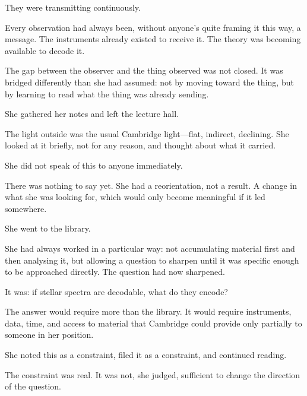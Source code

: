 They were transmitting continuously.

Every observation had always been, without anyone's quite
framing it this way, a message. The instruments already
existed to receive it. The theory was becoming available to
decode it.

The gap between the observer and the thing observed was not
closed. It was bridged differently than she had assumed: not by
moving toward the thing, but by learning to read what the thing
was already sending.

She gathered her notes and left the lecture hall.

The light outside was the usual Cambridge light---flat,
indirect, declining. She looked at it briefly, not for
any reason, and thought about what it carried.

\scenebreak

She did not speak of this to anyone immediately.

There was nothing to say yet. She had a reorientation, not a
result. A change in what she was looking for, which would only
become meaningful if it led somewhere.

She went to the library.

She had always worked in a particular way: not accumulating
material first and then analysing it, but allowing a question
to sharpen until it was specific enough to be approached
directly. The question had now sharpened.

It was: if stellar spectra are decodable, what do they encode?

The answer would require more than the library. It would require
instruments, data, time, and access to material that Cambridge
could provide only partially to someone in her position.

She noted this as a constraint, filed it as a constraint,
and continued reading.

The constraint was real. It was not, she judged, sufficient
to change the direction of the question.
